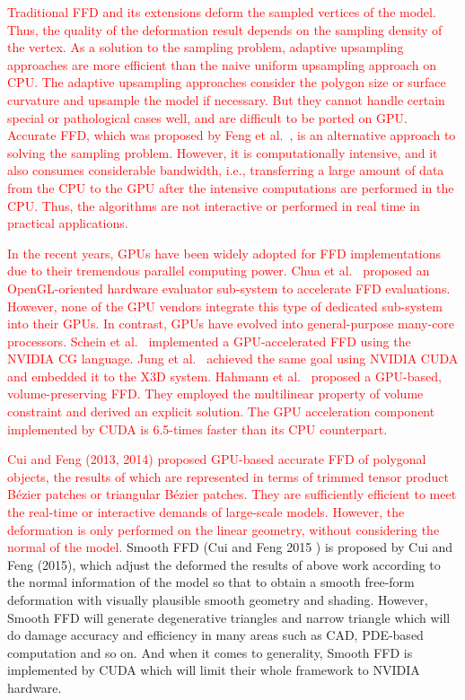 \documentclass[3p]{elsarticle}
\begin{document}
\textcolor{red}{Traditional FFD and its extensions deform the sampled vertices of the model. Thus, the quality of the deformation result
depends on the sampling density of the vertex. As a solution to the sampling problem, adaptive upsampling approaches
\cite{Gain99, Griessmair89, Parry86} are more efficient than the naive uniform upsampling approach on CPU. The adaptive
upsampling approaches consider the polygon size or surface curvature and upsample the model if necessary. But they
cannot handle certain special or pathological cases well, and are difficult to be ported on GPU. Accurate FFD, which
was proposed by Feng et al.~\cite{Feng98, Feng02, Feng00}, is an alternative approach to solving the sampling problem.
However, it is computationally intensive, and it also consumes considerable bandwidth, i.e., transferring a large amount
of data from the CPU to the GPU after the intensive computations are performed in the CPU. Thus, the algorithms are not
interactive or performed in real time in practical applications.}

\textcolor{red}{In the recent years, GPUs have been widely adopted for FFD implementations due to their tremendous parallel computing
power. Chua et al.~\cite{Chua00} proposed an OpenGL-oriented hardware evaluator sub-system to accelerate FFD
evaluations. However, none of the GPU vendors integrate this type of dedicated sub-system into their GPUs. In contrast,
GPUs have evolved into general-purpose many-core processors. Schein et al.~\cite{Schein06} implemented a GPU-accelerated
FFD using the NVIDIA CG language. Jung et al.~\cite{Jung11} achieved the same goal using NVIDIA CUDA and embedded it to
the X3D system. Hahmann et al.~\cite{Hahmann12} proposed a GPU-based, volume-preserving FFD. They employed the
multilinear property of volume constraint and derived an explicit solution. The GPU acceleration component implemented
by CUDA is 6.5-times faster than its CPU counterpart.}

\textcolor{red}{Cui and Feng (2013, 2014) proposed GPU-based accurate FFD of polygonal objects, the results of which are
represented in terms of trimmed tensor product Bézier patches or triangular Bézier patches. They are sufficiently
efficient to meet the real-time or interactive demands of large-scale models. However, the deformation is only performed
on the linear geometry, without considering the normal of the model.}
Smooth FFD (Cui and Feng 2015 ) is proposed by Cui and Feng (2015), which adjust the deformed the results of above work according to the normal information of the model so that to obtain a smooth free-form deformation with visually plausible smooth geometry and shading. However, Smooth FFD will generate degenerative triangles and narrow triangle which will do damage accuracy and efficiency in many areas such as CAD, PDE-based computation and so on. And when it comes to generality, Smooth FFD is implemented by CUDA which will limit their whole framework to NVIDIA hardware.
\end{document}
